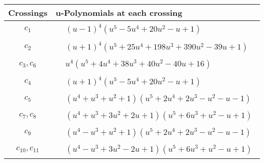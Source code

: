 \documentclass[1p]{elsarticle_modified}
\theoremstyle{definition}
\begin{document}
\begin{tabular}{m{50pt}|m{274pt}}
Crossings & \hspace{64pt}u-Polynomials at each crossing \\
\hline $$\begin{aligned}c_{1}\end{aligned}$$&$\begin{aligned}
&(u-1)^4(u^5-5 u^4+20 u^2- u+1)
\end{aligned}$\\
\hline $$\begin{aligned}c_{2}\end{aligned}$$&$\begin{aligned}
&(u+1)^4(u^5+25 u^4+198 u^3+390 u^2-39 u+1)
\end{aligned}$\\
\hline $$\begin{aligned}c_{3},c_{6}\end{aligned}$$&$\begin{aligned}
&u^4(u^5+4 u^4+38 u^3+40 u^2-40 u+16)
\end{aligned}$\\
\hline $$\begin{aligned}c_{4}\end{aligned}$$&$\begin{aligned}
&(u+1)^4(u^5-5 u^4+20 u^2- u+1)
\end{aligned}$\\
\hline $$\begin{aligned}c_{5}\end{aligned}$$&$\begin{aligned}
&(u^4+u^3+u^2+1)(u^5+2 u^4+2 u^3- u^2- u-1)
\end{aligned}$\\
\hline $$\begin{aligned}c_{7},c_{8}\end{aligned}$$&$\begin{aligned}
&(u^4+u^3+3 u^2+2 u+1)(u^5+6 u^3+u^2- u+1)
\end{aligned}$\\
\hline $$\begin{aligned}c_{9}\end{aligned}$$&$\begin{aligned}
&(u^4- u^3+u^2+1)(u^5+2 u^4+2 u^3- u^2- u-1)
\end{aligned}$\\
\hline $$\begin{aligned}c_{10},c_{11}\end{aligned}$$&$\begin{aligned}
&(u^4- u^3+3 u^2-2 u+1)(u^5+6 u^3+u^2- u+1)
\end{aligned}$\\
\hline
\end{tabular}\newpage\renewcommand{\arraystretch}{1}
\end{document}
